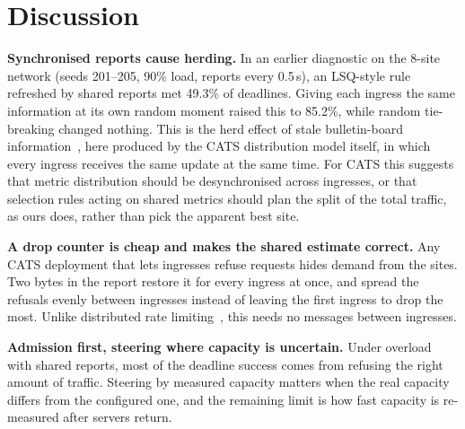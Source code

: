 \documentclass[conference]{IEEEtran}
\begin{document}
\section{Discussion}\label{sec:discussion}
\textbf{Synchronised reports cause herding.} In an earlier diagnostic on the 8-site network (seeds 201--205, 90\% load, reports every 0.5\,s), an LSQ-style rule refreshed by shared reports met 49.3\% of deadlines. Giving each ingress the same information at its own random moment raised this to 85.2\%, while random tie-breaking changed nothing. This is the herd effect of stale bulletin-board information~\cite{mitz2000old}, here produced by the CATS distribution model itself, in which every ingress receives the same update at the same time. For CATS this suggests that metric distribution should be desynchronised across ingresses, or that selection rules acting on shared metrics should plan the split of the total traffic, as ours does, rather than pick the apparent best site.

\textbf{A drop counter is cheap and makes the shared estimate correct.} Any CATS deployment that lets ingresses refuse requests hides demand from the sites. Two bytes in the report restore it for every ingress at once, and spread the refusals evenly between ingresses instead of leaving the first ingress to drop the most. Unlike distributed rate limiting~\cite{drl}, this needs no messages between ingresses.

\textbf{Admission first, steering where capacity is uncertain.} Under overload with shared reports, most of the deadline success comes from refusing the right amount of traffic. Steering by measured capacity matters when the real capacity differs from the configured one, and the remaining limit is how fast capacity is re-measured after servers return.
\end{document}
